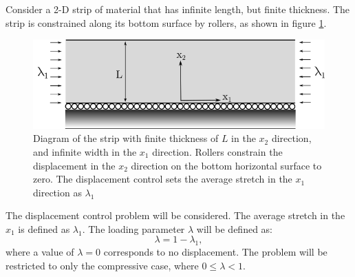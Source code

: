 \documentclass[11pt]{article}
\begin{document}
Consider a 2-D strip of material that has infinite length, but finite thickness. The strip is constrained along its bottom surface by rollers, as shown in figure \ref{fig:stripFig}.
\begin{figure}[h] 
\begin{center}
\includegraphics[scale=0.7]{compressed_strip_drawing}
\end{center}
\captionsetup{format=hang}
\caption{Diagram of the strip with finite thickness of $L$ in the $x_2$ direction, and infinite width in the $x_1$ direction. Rollers constrain the displacement in the $x_2$ direction on the bottom horizontal surface to zero. The displacement control sets the average stretch in the $x_1$ direction as $\lambda_1$}
\label{fig:stripFig}
\end{figure}

The displacement control problem will be considered. The average stretch in the $x_1$ is defined as $\lambda_1$. The loading parameter $\lambda$ will be defined as:
\begin{equation}
\lambda = 1 - \lambda_1,
\end{equation} 
where a value of $\lambda = 0$ corresponds to no displacement. The problem will be restricted to only the compressive case, where $ 0 \leq \lambda < 1 $. 
\end{document}
